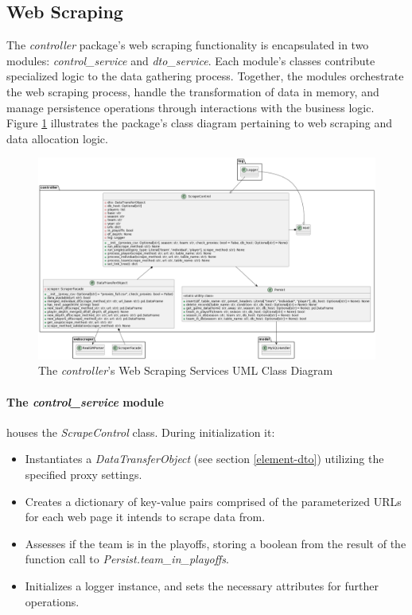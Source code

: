 \documentclass{thesis-ekf}
\theoremstyle{definition}
\theoremstyle{remark}
\begin{document}



\subsection{Web Scraping}
The \emph{controller} package's web scraping functionality is encapsulated in two modules: \emph{control\_service} and \emph{dto\_service}. Each module's classes contribute specialized logic to the data gathering process. Together, the modules orchestrate the web scraping process, handle the transformation of data in memory, and manage persistence operations through interactions with the business logic. Figure \ref{img-controller-scrapecontrol-class} illustrates the package's class diagram pertaining to web scraping and data allocation logic.

\begin{figure}[th!]
	\centering
	\includegraphics[width=1\linewidth]{img/class/controller_scrapecontrol}
	\caption{The \emph{controller}'s Web Scraping Services UML Class Diagram}
	\label{img-controller-scrapecontrol-class}
\end{figure}

\paragraph{The \emph{control\_service} module} houses the \emph{ScrapeControl} class. During initialization it:
\begin{itemize}
  \item Instantiates a \emph{DataTransferObject} (see section \ref{element-dto}) utilizing the specified proxy settings.
  
  \item Creates a dictionary of key-value pairs comprised of the parameterized URLs for each web page it intends to scrape data from.
  
  \item Assesses if the team is in the playoffs, storing a boolean from the result of the function call to \emph{Persist.team\_in\_playoffs}.
  
  \item Initializes a logger instance, and sets the necessary attributes for further operations.
\end{itemize}
\end{document}
